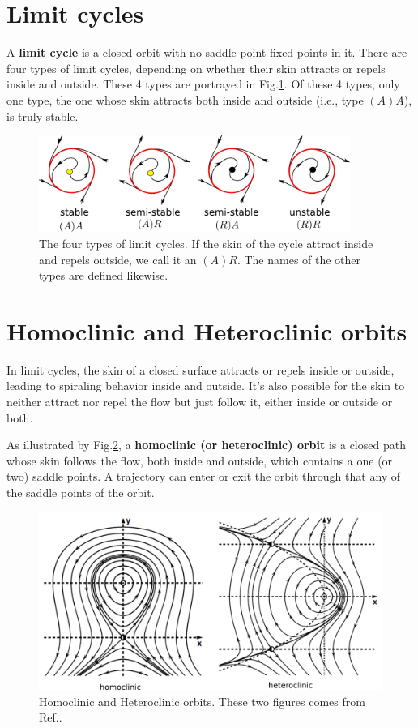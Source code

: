 \section{Limit cycles}

A {\bf limit cycle} is a closed orbit with no saddle point fixed 
points in it. There are four types of limit cycles, depending on whether their skin attracts or repels inside and outside.
 These 4 types are portrayed  in Fig.\ref{fig-limit-cycles}. Of these 4 types, only one type, the one whose skin attracts both inside and outside (i.e., type $(A)A$), is truly stable.

\begin{figure}[h!]
\centering
\includegraphics[width=4in]
{dynamical-sys/limit-cycles.png}
\caption{The four types of limit cycles. If the 
skin of the cycle attract inside and repels outside,
we call it an $(A)R$. The names of the other types
are defined likewise. }
\label{fig-limit-cycles}
\end{figure}

\section{Homoclinic and Heteroclinic orbits}

In limit cycles, the skin of a closed surface attracts
or
repels inside or outside, leading to spiraling behavior inside and outside. It's also possible for
the skin to neither attract nor repel the flow but just follow it, either inside or outside or both.


As illustrated by Fig.\ref{fig-homo-hetero-clinic}, 
a {\bf homoclinic (or heteroclinic) orbit}  is a closed path whose skin  
follows the flow, both inside and outside, which contains a one (or two) saddle points. 
A trajectory can enter or exit the orbit through that any of the saddle points of the orbit.


\begin{figure}[h!]
\centering
\includegraphics[width=6in]
{dynamical-sys/homo-hetero-clinic.png}
\caption{Homoclinic and Heteroclinic orbits.
These two
 figures  comes from Ref.\cite{dynamical-fuchs}.}
\label{fig-homo-hetero-clinic}
\end{figure}


